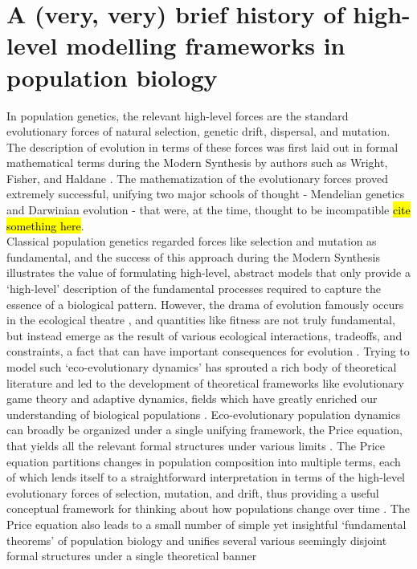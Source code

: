 \section{A (very, very) brief history of high-level modelling frameworks in population biology}

In population genetics, the relevant high-level forces are the standard evolutionary forces of natural selection, genetic drift, dispersal, and mutation. The description of evolution in terms of these forces was first laid out in formal mathematical terms during the Modern Synthesis by authors such as Wright, Fisher, and Haldane \citep{ewens_mathematical_2004}. The mathematization of the evolutionary forces proved extremely successful, unifying two major schools of thought - Mendelian genetics and Darwinian evolution - that were, at the time, thought to be incompatible \hl{cite something here}.\\
Classical population genetics regarded forces like selection and mutation as fundamental, and the success of this approach during the Modern Synthesis illustrates the value of formulating high-level, abstract models that only provide a `high-level' description of the fundamental processes required to capture the essence of a biological pattern. However, the drama of evolution famously occurs in the ecological theatre \citep{hutchinson_ecological_1965}, and quantities like fitness are not truly fundamental, but instead emerge as the result of various ecological interactions, tradeoffs, and constraints, a fact that can have important consequences for evolution \citep{coulson_putting_2006, kokko_can_2017}. Trying to model such `eco-evolutionary dynamics' has sprouted a rich body of theoretical literature and led to the development of theoretical frameworks like evolutionary game theory and adaptive dynamics, fields which have greatly enriched our understanding of biological populations \citep{brown_why_2016}. Eco-evolutionary population dynamics can broadly be organized under a single unifying framework, the Price equation, that yields all the relevant formal structures under various limits \citep{page_unifying_2002, lion_theoretical_2018}. The Price equation partitions changes in population composition into multiple terms, each of which lends itself to a straightforward interpretation in terms of the high-level evolutionary forces of selection, mutation, and drift, thus providing a useful conceptual framework for thinking about how populations change over time \citep{frank_natural_2012}. The Price equation also leads to a small number of simple yet insightful `fundamental theorems' of population biology \citep{queller_fundamental_2017, lion_theoretical_2018, lehtonen_price_2018} and unifies several various seemingly disjoint formal structures under a single theoretical banner \citep{ lehtonen_price_2020, luque_mirror_2021}\\
